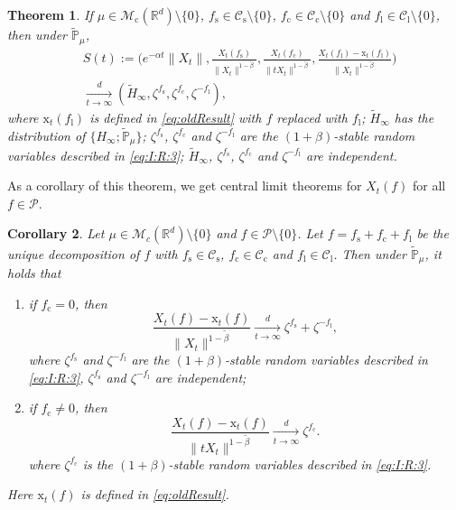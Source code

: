 \documentclass[12pt,a4paper]{amsart}
\theoremstyle{plain}
\newtheorem{thm}{Theorem}[section]
\newtheorem{cor}[thm]{Corollary}
\theoremstyle{definition}
\numberwithin{equation}{section}
\begin{document}
\begin{thm}
	\label{thm:M}
	If $\mu\in \mathcal M_\mathrm c(\mathbb R^d)\setminus \{0\}$, $f_\mathrm s\in \mathcal C_\mathrm s\setminus\{0\}$, $f_\mathrm c \in \mathcal C_\mathrm c\setminus\{0\}$ and $f_\mathrm l \in \mathcal C_\mathrm l\setminus\{0\}$, then under $\mathbb {\widetilde P}_\mu$,
	\begin{align} \label{eq:M.1}
	&S(t):=
	\Bigg(e^{-\alpha t}\|X_t\|, \frac{X_t(f_\mathrm s)}{\|X_t\|^{1-\tilde \beta}},\frac{X_t(f_\mathrm c)}{\|tX_t\|^{1-\tilde \beta}},
	\frac{ X_t(f_\mathrm l) - \mathrm x_t(f_\mathrm l)}{\|X_t\|^{1-\tilde \beta}}
	\Bigg)
	\\&\xrightarrow[t\rightarrow \infty]{d}(\widetilde H_\infty,\zeta^{f_\mathrm s},\zeta^{f_\mathrm c},\zeta^{-f_\mathrm l}),
	\end{align}
	where 
$\mathrm x_t(f_\mathrm l)$ is defined in \eqref{eq:oldResult} with $f$ replaced with $f_\mathrm l$;
$\widetilde H_\infty$ has the distribution of $\{H_{\infty}; \widetilde {\mathbb P}_\mu\}$; $\zeta^{f_\mathrm s}$, $\zeta^{f_\mathrm c}$ and $\zeta^{-f_\mathrm l}$ are the $(1+\beta)$-stable random variables described in \eqref{eq:I:R:3}; $\widetilde H_\infty$,  $\zeta^{f_\mathrm s}$, $\zeta^{f_\mathrm c}$ and $\zeta^{-f_\mathrm l}$ are independent.
\end{thm}

As a corollary of this theorem, we get  central limit theorems for $X_t(f)$ for all $f\in \mathcal P$.

\begin{cor} Let $\mu\in \mathcal M_c(\mathbb R^d)\setminus \{0\}$ and $f\in \mathcal P\setminus\{0\}$. Let  $f=f_\mathrm s + f_\mathrm c + f_\mathrm l$ be the unique decomposition of $f$ with $f_\mathrm s \in \mathcal C_\mathrm s$, $f_\mathrm c \in \mathcal C_\mathrm c$ and $f_\mathrm l \in \mathcal C_\mathrm l$.
Then under $\widetilde {\mathbb{P}}_{\mu}$, it holds that
\begin{enumerate}
\item  if $f_\mathrm c=0$, then
\[
    \frac{ X_t(f) - \mathrm x_t(f)}{\|X_t\|^{1-\tilde \beta}}
    \xrightarrow[t\to \infty]{d}
       \zeta^{f_\mathrm s}+\zeta^{-f_\mathrm l},
\]
	where $\zeta^{f_\mathrm s}$ and $\zeta^{-f_\mathrm l}$  are the $(1+\beta)$-stable random variables described in \eqref{eq:I:R:3}, $\zeta^{f_\mathrm s}$ and $\zeta^{-f_\mathrm l}$ are independent;
\item if $f_\mathrm c\neq0$, then
\[
    \frac{ X_t(f) - \mathrm x_t(f)}{\|tX_t\|^{1-\tilde \beta}}
    \xrightarrow[t\to \infty]{d}\zeta^{f_\mathrm c}.
\]
	where $\zeta^{f_\mathrm c}$ is the $(1+\beta)$-stable random variables described in \eqref{eq:I:R:3}.
\end{enumerate}
Here $\mathrm x_t(f)$ is defined in \eqref{eq:oldResult}.
\end{cor}
\end{document}
